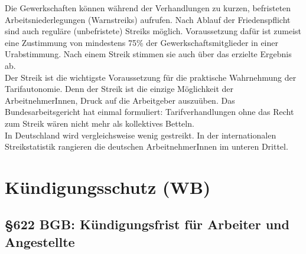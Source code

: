 \documentclass[a4paper, 12pt]{report}
\begin{document}
\begin{multicols}{2}
Die Gewerkschaften können während der Verhandlungen zu kurzen, befristeten
Arbeitsniederlegungen (Warnstreiks) aufrufen. Nach Ablauf der Friedenspflicht
sind auch reguläre (unbefristete) Streiks möglich. Voraussetzung dafür ist
zumeist eine Zustimmung von mindestens 75\% der Gewerkschaftsmitglieder in einer
Urabstimmung. Nach einem Streik stimmen sie auch über das erzielte Ergebnis
ab. \\

Der Streik ist die wichtigste Voraussetzung für die praktische Wahrnehmung der
\glqq Tarifautonomie\grqq{}. Denn der Streik ist die einzige Möglichkeit der
ArbeitnehmerInnen, Druck auf die Arbeitgeber auszuüben. Das Bundesarbeitsgericht
hat einmal formuliert: \glqq Tarifverhandlungen ohne das Recht zum Streik wären
nicht mehr als kollektives Betteln\grqq{}. \\

In Deutschland wird vergleichsweise wenig gestreikt. In der internationalen
Streikstatistik rangieren die deutschen ArbeitnehmerInnen im unteren Drittel.

\section{Kündigungsschutz (WB)}

\subsection{\S 622 BGB: Kündigungsfrist für Arbeiter und Angestellte}


\end{multicols}
\end{document}
